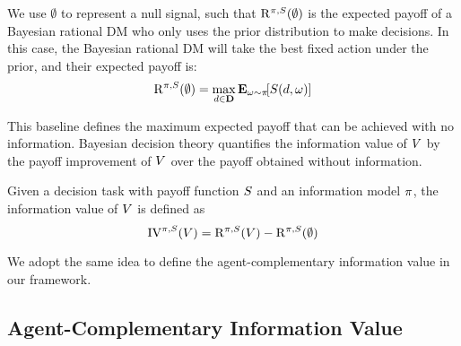 We use $\emptyset$ to represent a null signal, such that $\mathrm{R}^{\pi, S}(\emptyset)$ is the expected payoff of a Bayesian rational DM who only uses the prior distribution to make decisions.
In this case, the Bayesian rational DM will take the best fixed action under the prior, and their expected payoff is:
\mvspace{-1mm}
\begin{equation}
\label{eq:baseline}
\mathrm{R}^{\dgp, \score}
(\emptyset) 
= \max_{\action \in \actionspace} \expect[\payoffstatevalue \sim \pi]{\score(\action, \payoffstatevalue)}
\end{equation}
\mvspace{-4mm}

This baseline defines the maximum expected payoff that can be achieved with no information.
Bayesian decision theory quantifies the information value of $V$ by the payoff improvement of $V$ over the payoff obtained without information.


\begin{definition}
Given a decision task with payoff function $S$ and an information model $\pi$, the information value of $V$ is defined as
\mvspace{-1mm}\begin{equation}
    \operatorname{IV}^{\pi, S}(V) = \mathrm{R}^{\pi, S}
(V) - \mathrm{R}^{\pi, S}
(\emptyset)
\end{equation}
\end{definition}
\mvspace{-2mm}
We adopt the same idea to define the agent-complementary information value in our framework.

\mvspace{-2mm}
\subsection{Agent-Complementary Information Value}
\mvspace{-2mm}

